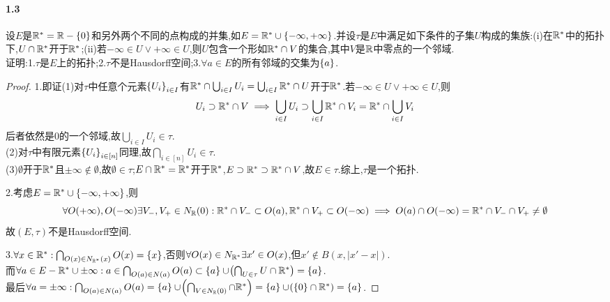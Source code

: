 \documentclass[UTF8]{article}
\begin{document}
\paragraph*{1.3}设$E$是$\mathbb{R}^*=\mathbb{R}-\left\{0\right\}$和另外两个不同的点构成的并集,如$E=\mathbb{R}^*\cup\left\{-\infty,+\infty\right\}$.并设$\tau$是$E$中满足如下条件的子集$U$构成的集族:(i)在$\mathbb{R}^*$中的拓扑下,$U\cap \mathbb{R}^*$开于$\mathbb{R}^*$;(ii)若$-\infty\in U\lor +\infty\in U$,则$U$包含一个形如$\mathbb{R}^*\cap V$的集合,其中$V$是$\mathbb{R}$中零点的一个邻域.\\
证明:1.$\tau$是$E$上的拓扑;2.$\tau$不是Hausdorff空间;3.$\forall a\in E$的所有邻域的交集为$\left\{a\right\}$.
\begin{proof}
    1.即证(1)对$\tau$中任意个元素$\left\{U_i\right\}_{i\in I}$有$\mathbb{R}^*\cap\bigcup_{i\in I}U_i=\bigcup_{i\in I}\mathbb{R}^*\cap U$开于$\mathbb{R}^*$.若$-\infty\in U\lor +\infty\in U$,则$$U_i\supset \mathbb{R}^*\cap V\implies \bigcup_{i\in I}U_i\supset \bigcup_{i\in I}\mathbb{R}^*\cap V_i=\mathbb{R}^*\cap\bigcup_{i\in I}V_i$$
    后者依然是0的一个邻域,故$\bigcup_{i\in I}U_i\in \tau$.\\
    (2)对$\tau$中有限元素$\left\{U_i\right\}_{i\in [n]}$同理,故$\bigcap_{i\in [n]}U_i\in \tau$.\\
    (3)$\emptyset$开于$\mathbb{R}^*$且$\pm\infty\notin\emptyset$,故$\emptyset\in \tau$;$E\cap \mathbb{R}^*=\mathbb{R}^*$开于$\mathbb{R}^*$,$E\supset \mathbb{R}^*\supset \mathbb{R}^*\cap V$,故$E\in \tau$.综上,$\tau$是一个拓扑.

    2.考虑$E=\mathbb{R}^*\cup\left\{-\infty,+\infty\right\}$,则$$\forall O(+\infty),O(-\infty)\exists V_-,V_+\in N_{\mathbb{R}}(0):\mathbb{R}^*\cap V_-\subset O(a),\mathbb{R}^*\cap V_+\subset O(-\infty)\implies O(a)\cap O(-\infty)=\mathbb{R}^*\cap V_-\cap V_+\neq \emptyset$$
    故$(E,\tau)$不是Hausdorff空间.

    3.$\forall x\in \mathbb{R}^*: \bigcap_{O(x)\in N_{\mathbb{R}^*}(x)}O(x)=\left\{x\right\}$,否则$\forall O(x)\in N_{\mathbb{R}^*}\exists x'\in O(x)$,但$x'\notin B(x,|x'-x|)$.\\
    而$\forall a\in E-\mathbb{R}^*\cup \pm\infty: a\in\bigcap_{O(a)\in N(a)} O(a)\subset\left\{a\right\}\cup \!\left(\bigcap_{U\in \tau}U\cap \mathbb{R}^*\right)=\left\{a\right\}$.\\
    最后$\forall a=\pm\infty:\bigcap_{O(a)\in N(a)} O(a)=\left\{a\right\}\cup \!\left(\bigcap_{V\in N_{\mathbb{R}}(0)}\cap \mathbb{R}^*\right)=\left\{a\right\}\cup \!\left(\left\{0\right\}\cap \mathbb{R}^*\right)=\left\{a\right\}$.
\end{proof}
\end{document}
